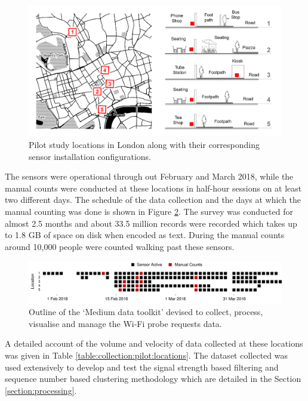 \begin{figure}
  \centering
  \includegraphics[trim={20 20 20 20},clip, width=\textwidth]{images/pilot-study-locations.png}
  \caption{Pilot study locations in London along with their corresponding sensor installation configurations.}
  \label{figure:collection:pilot:locations}
\end{figure}

The sensors were operational through out February and March 2018, while the manual counts were conducted at these locations in half-hour sessions on at least two different days.
The schedule of the data collection and the days at which the manual counting was done is shown in Figure \ref{figure:collection:pilot:schedule}.
The survey was conducted for almost 2.5 months and about 33.5 million records were recorded which takes up to 1.8 GB of space on disk when encoded as text.
During the manual counts around 10,000 people were counted walking past these sensors.

\begin{figure}
  \includegraphics{images/pilot-study-schedule.png}
  \caption{Outline of the `Medium data toolkit' devised to collect, process, visualise and manage the Wi-Fi probe requests data.}
  \label{figure:collection:pilot:schedule}
\end{figure}

A detailed account of the volume and velocity of data collected at these locations was given in Table \ref{table:collection:pilot:locations}.
The dataset collected was used extensively to develop and test the signal strength based filtering and sequence number based clustering methodology which are detailed in the Section \ref{section:processing}.

